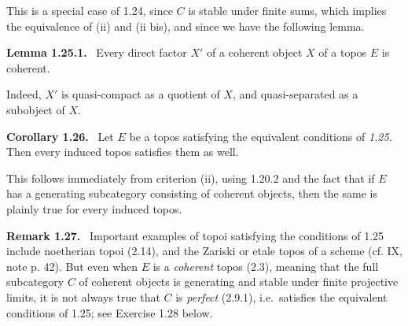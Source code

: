 \documentclass[11pt]{article}
\newcommand{\ie}{i.e.\ }
\newenvironment{statement}[1]{\par\medskip\noindent\textbf{#1.}\ }{\par\medskip}
\newenvironment{remarktext}[1]{\par\medskip\noindent\textbf{#1.}\ }{\par\medskip}
\begin{document}
This is a special case of 1.24, since \(C\) is stable under finite sums, which implies the equivalence of (ii) and (ii bis), and since we have the following lemma.

\begin{statement}{Lemma 1.25.1}
Every direct factor \(X'\) of a coherent object \(X\) of a topos \(E\) is coherent.
\end{statement}

Indeed, \(X'\) is quasi-compact as a quotient of \(X\), and quasi-separated as a subobject of \(X\).

\begin{statement}{Corollary 1.26}
Let \(E\) be a topos satisfying the equivalent conditions of \emph{1.25}. Then every induced topos satisfies them as well.
\end{statement}

This follows immediately from criterion (ii), using 1.20.2 and the fact that if \(E\) has a generating subcategory consisting of coherent objects, then the same is plainly true for every induced topos.

\begin{remarktext}{Remark 1.27}
Important examples of topoi satisfying the conditions of 1.25 include noetherian topoi (2.14), and the Zariski or etale topos of a scheme (cf. IX, note p. 42). But even when \(E\) is a \emph{coherent} topos (2.3), meaning that the full subcategory \(C\) of coherent objects is generating and stable under finite projective limits, it is not always true that \(C\) is \emph{perfect} (2.9.1), \ie satisfies the equivalent conditions of 1.25; see Exercise 1.28 below.
\end{remarktext}
\end{document}
